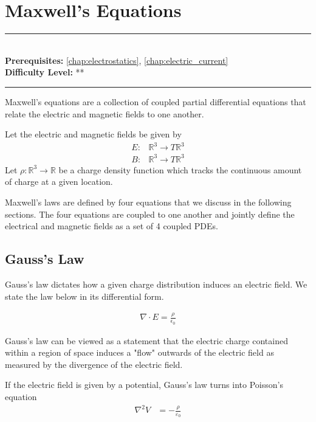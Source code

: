 \documentclass[book.tex]{subfiles}
\begin{document}
\chapter{Maxwell's Equations}
\label{chap:maxwells_equations}
\noindent\rule{11cm}{0.4pt} \\
\textbf{Prerequisites:} \autoref{chap:electrostatics}, \autoref{chap:electric_current}  \\
\textbf{Difficulty Level:} ** \\
\noindent\rule{11cm}{0.4pt}
\vspace{5mm}

Maxwell's equations are a collection of coupled partial differential equations that relate the electric and magnetic fields to one another.

Let the electric and magnetic fields be given by
\begin{align}
E: &\mathbb{R}^3 \to T \mathbb{R}^3 \\
B: &\mathbb{R}^3 \to T \mathbb{R}^3
\end{align} 
Let $\rho: \mathbb{R}^3 \to \mathbb{R}$ be a charge density function which tracks the continuous amount of charge at a given location. 

Maxwell's laws are defined by four equations that we discuss in the following sections. The four equations are coupled to one another and jointly define the electrical and magnetic fields as a set of 4 coupled PDEs.

\section{Gauss's Law}

Gauss's law dictates how a given charge distribution induces an electric field. We state the law below in its differential form.

\begin{align}
\nabla \cdot E = \frac{\rho}{\epsilon_0}
\end{align} 

Gauss's law can be viewed as a statement that the electric charge contained within a region of space induces a "flow" outwards of the electric field as measured by the divergence of the electric field. 

If the electric field is given by a potential, Gauss's law turns into Poisson's equation
\begin{align}
\nabla^2 V &= - \frac{\rho}{\varepsilon_0}
\end{align}
    
\end{document}
